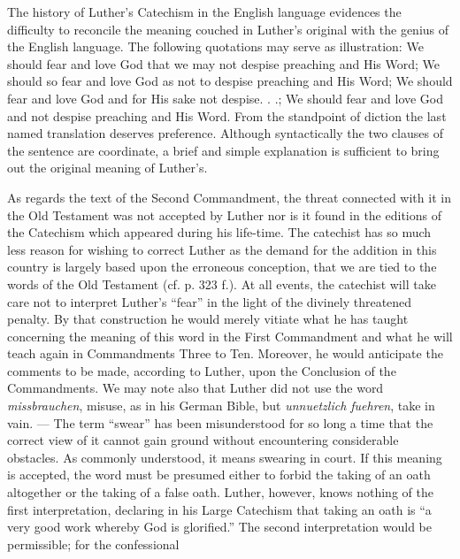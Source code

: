 The history of Luther’s Catechism in the English language evidences the difficulty to reconcile the meaning couched in Luther’s original with the genius of the English language. The following quotations may serve as illustration: We should fear and love God that we may not despise preaching and His Word; We should so fear and love God as not to despise preaching and His Word; We should fear and love God and for His sake not despise. . .; We should fear and love God and not despise preaching and His Word. From the standpoint of diction the last named translation deserves preference. Although syntactically the two clauses of the sentence are coordinate, a brief and simple explanation is sufficient to bring out the original meaning of Luther’s.

As regards the text of the Second Commandment, the threat connected with it in the Old Testament was not accepted by Luther nor is it found in the editions of the Catechism which appeared during his life-time. The catechist has so much less reason for wishing to correct Luther as the demand for the addition in this country is largely based upon the erroneous conception, that we are tied to the words of the Old Testament (cf. p. 323 f.). At all events, the catechist will take care not to interpret Luther’s “fear” in the light of the divinely threatened penalty. By that construction he would merely vitiate what he has taught concerning the meaning of this word in the First Commandment and what he will teach again in Commandments Three to Ten. Moreover, he would anticipate the comments to be made, according to Luther, upon the Conclusion of the Commandments. We may note also that Luther did not use the word \emph{missbrauchen}, misuse, as in his German Bible, but \emph{unnuetzlich fuehren}, take in vain. — The term “swear” has been misunderstood for so long a time that the correct view of it cannot gain ground without encountering considerable obstacles. As commonly understood, it means swearing in court. If this meaning is accepted, the word must be presumed either to forbid the taking of an oath altogether or the taking of a false oath. Luther, however, knows nothing of the first interpretation, declaring in his Large Catechism that taking an oath is “a very good work whereby God is glorified.” The second interpretation would be permissible; for the confessional

